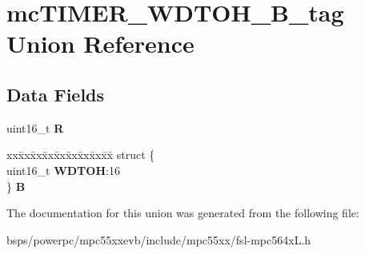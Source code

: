 \hypertarget{unionmcTIMER__WDTOH__16B__tag}{}\section{mc\+T\+I\+M\+E\+R\+\_\+\+W\+D\+T\+O\+H\+\_\+B\+\_\+tag Union Reference}
\label{unionmcTIMER__WDTOH__16B__tag}
\subsection*{Data Fields}
\begin{DoxyCompactItemize}
\item 
\mbox{\label{unionmcTIMER__WDTOH__16B__tag_af71ed003e01c67e5c87e6c3d666a3750}} 
uint16\+\_\+t {\bfseries R}
\item 
\mbox{\label{unionmcTIMER__WDTOH__16B__tag_a515c8ccd0b3c2530ff2d70ad3e8b83ec}} 
\begin{tabbing}
xx\=xx\=xx\=xx\=xx\=xx\=xx\=xx\=xx\=\kill
struct \{\\
\>uint16\_t {\bfseries WDTOH}:16\\
\} {\bfseries B}\\

\end{tabbing}\end{DoxyCompactItemize}


The documentation for this union was generated from the following file\+:\begin{DoxyCompactItemize}
\item 
bsps/powerpc/mpc55xxevb/include/mpc55xx/fsl-\/mpc564x\+L.\+h\end{DoxyCompactItemize}

